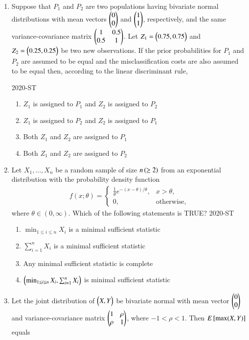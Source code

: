 \documentclass[journal]{IEEEtran}
\begin{document}
\begin{enumerate}
\item Suppose that $P_1$ and $P_2$ are two populations having bivariate normal distributions with mean vectors $\begin{pmatrix} 0 \\ 0 \end{pmatrix}$ and $\begin{pmatrix} 1 \\ 1 \end{pmatrix}$, respectively, and the same variance-covariance matrix $\begin{pmatrix} 1 & 0.5 \\ 0.5 & 1 \end{pmatrix}$. Let $Z_1 = \begin{pmatrix}0.75, 0.75\end{pmatrix}$ and $Z_2 = \begin{pmatrix}0.25, 0.25\end{pmatrix}$ be two new observations. If the prior probabilities for $P_1$ and $P_2$ are assumed to be equal and the misclassification costs are also assumed to be equal then, according to the linear discriminant rule,

\hfill{2020-ST}
\begin{enumerate}
    \item $Z_1$ is assigned to $P_1$ and $Z_2$ is assigned to $P_2$
    \item $Z_1$ is assigned to $P_2$ and $Z_2$ is assigned to $P_1$
    \item Both $Z_1$ and $Z_2$ are assigned to $P_1$
    \item Both $Z_1$ and $Z_2$ are assigned to $P_2$
\end{enumerate}

\item Let $X_1, \dots, X_n$ be a random sample of size $n \left(\geq 2\right)$ from an exponential distribution with the probability density function
\begin{align*}
f(x; \theta) = \begin{cases} 
\frac{1}{\theta} e^{-(x - \theta)/\theta}, & x > \theta, \\
0, & \text{otherwise},
\end{cases}
\end{align*}
where $\theta \in (0, \infty)$. Which of the following statements is TRUE?
\hfill{2020-ST}
\begin{enumerate}
    \item $\min_{1 \leq i \leq n} X_i$ is a minimal sufficient statistic
    \item $\sum_{i=1}^n X_i$ is a minimal sufficient statistic
    \item Any minimal sufficient statistic is complete
    \item $\left( \min_{1 \leq i \leq n} X_i, \sum_{i=1}^n X_i\right)$ is minimal sufficient statistic
\end{enumerate}

\item Let the joint distribution of $\begin{pmatrix}X, Y\end{pmatrix}$ be bivariate normal with mean vector $\begin{pmatrix} 0 \\ 0 \end{pmatrix}$ and variance-covariance matrix $\begin{pmatrix} 1 & \rho \\ \rho & 1\end{pmatrix}$, where $-1 < \rho < 1$. Then $E {}\left[\max(X, Y)\right]$ equals


\end{enumerate}
\end{document}
